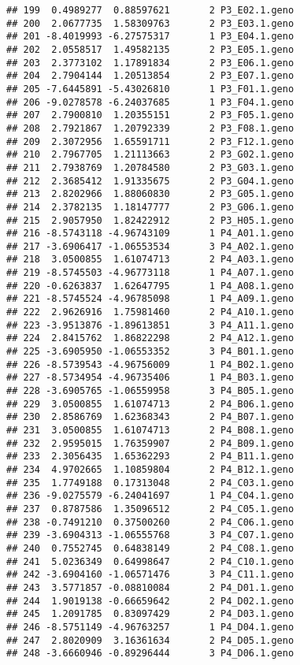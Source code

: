 \documentclass[]{article}
\begin{document}
\begin{verbatim}
## 199  0.4989277  0.88597621       2 P3_E02.1.geno
## 200  2.0677735  1.58309763       2 P3_E03.1.geno
## 201 -8.4019993 -6.27575317       1 P3_E04.1.geno
## 202  2.0558517  1.49582135       2 P3_E05.1.geno
## 203  2.3773102  1.17891834       2 P3_E06.1.geno
## 204  2.7904144  1.20513854       2 P3_E07.1.geno
## 205 -7.6445891 -5.43026810       1 P3_F01.1.geno
## 206 -9.0278578 -6.24037685       1 P3_F04.1.geno
## 207  2.7900810  1.20355151       2 P3_F05.1.geno
## 208  2.7921867  1.20792339       2 P3_F08.1.geno
## 209  2.3072956  1.65591711       2 P3_F12.1.geno
## 210  2.7967705  1.21113663       2 P3_G02.1.geno
## 211  2.7938769  1.20784580       2 P3_G03.1.geno
## 212  2.3685412  1.91335675       2 P3_G04.1.geno
## 213  2.8202966  1.88060830       2 P3_G05.1.geno
## 214  2.3782135  1.18147777       2 P3_G06.1.geno
## 215  2.9057950  1.82422912       2 P3_H05.1.geno
## 216 -8.5743118 -4.96743109       1 P4_A01.1.geno
## 217 -3.6906417 -1.06553534       3 P4_A02.1.geno
## 218  3.0500855  1.61074713       2 P4_A03.1.geno
## 219 -8.5745503 -4.96773118       1 P4_A07.1.geno
## 220 -0.6263837  1.62647795       1 P4_A08.1.geno
## 221 -8.5745524 -4.96785098       1 P4_A09.1.geno
## 222  2.9626916  1.75981460       2 P4_A10.1.geno
## 223 -3.9513876 -1.89613851       3 P4_A11.1.geno
## 224  2.8415762  1.86822298       2 P4_A12.1.geno
## 225 -3.6905950 -1.06553352       3 P4_B01.1.geno
## 226 -8.5739543 -4.96756009       1 P4_B02.1.geno
## 227 -8.5734954 -4.96735406       1 P4_B03.1.geno
## 228 -3.6905765 -1.06559958       3 P4_B05.1.geno
## 229  3.0500855  1.61074713       2 P4_B06.1.geno
## 230  2.8586769  1.62368343       2 P4_B07.1.geno
## 231  3.0500855  1.61074713       2 P4_B08.1.geno
## 232  2.9595015  1.76359907       2 P4_B09.1.geno
## 233  2.3056435  1.65362293       2 P4_B11.1.geno
## 234  4.9702665  1.10859804       2 P4_B12.1.geno
## 235  1.7749188  0.17313048       2 P4_C03.1.geno
## 236 -9.0275579 -6.24041697       1 P4_C04.1.geno
## 237  0.8787586  1.35096512       2 P4_C05.1.geno
## 238 -0.7491210  0.37500260       2 P4_C06.1.geno
## 239 -3.6904313 -1.06555768       3 P4_C07.1.geno
## 240  0.7552745  0.64838149       2 P4_C08.1.geno
## 241  5.0236349  0.64998647       2 P4_C10.1.geno
## 242 -3.6904160 -1.06571476       3 P4_C11.1.geno
## 243  3.5771857 -0.08810084       2 P4_D01.1.geno
## 244  1.9019138 -0.66659642       2 P4_D02.1.geno
## 245  1.2091785  0.83097429       2 P4_D03.1.geno
## 246 -8.5751149 -4.96763257       1 P4_D04.1.geno
## 247  2.8020909  3.16361634       2 P4_D05.1.geno
## 248 -3.6660946 -0.89296444       3 P4_D06.1.geno

\end{verbatim}
\end{document}

